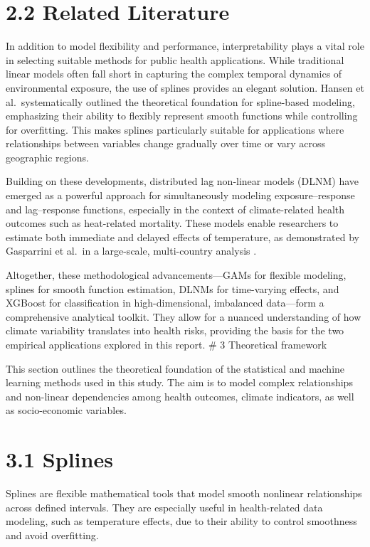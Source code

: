 \documentclass[
]{krantz}
\begin{document}
\section{2.2 Related Literature}\label{related-literature}

In addition to model flexibility and performance, interpretability plays a vital role in selecting suitable methods for public health applications. While traditional linear models often fall short in capturing the complex temporal dynamics of environmental exposure, the use of splines provides an elegant solution. Hansen et al.~systematically outlined the theoretical foundation for spline-based modeling, emphasizing their ability to flexibly represent smooth functions while controlling for overfitting. This makes splines particularly suitable for applications where relationships between variables change gradually over time or vary across geographic regions.\citep{hansen2006}

Building on these developments, distributed lag non-linear models (DLNM) have emerged as a powerful approach for simultaneously modeling exposure--response and lag--response functions, especially in the context of climate-related health outcomes such as heat-related mortality. These models enable researchers to estimate both immediate and delayed effects of temperature, as demonstrated by Gasparrini et al.~in a large-scale, multi-country analysis \citep{gasparrini2015}.

Altogether, these methodological advancements---GAMs for flexible modeling, splines for smooth function estimation, DLNMs for time-varying effects, and XGBoost for classification in high-dimensional, imbalanced data---form a comprehensive analytical toolkit. They allow for a nuanced understanding of how climate variability translates into health risks, providing the basis for the two empirical applications explored in this report.
\# 3 Theoretical framework

This section outlines the theoretical foundation of the statistical and machine learning methods used in this study. The aim is to model complex relationships and non-linear dependencies among health outcomes, climate indicators, as well as socio-economic variables.

\section{3.1 Splines}\label{splines}

Splines are flexible mathematical tools that model smooth nonlinear relationships across defined intervals. They are especially useful in health-related data modeling, such as temperature effects, due to their ability to control smoothness and avoid overfitting.\citep{hansen2006}
\end{document}
